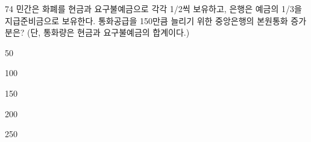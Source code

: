 \begin{question}{74}
민간은 화폐를 현금과 요구불예금으로 각각 1/2씩 보유하고, 은행은 예금의 1/3을 지급준비금으로 보유한다. 통화공급을 150만큼 늘리기 위한 중앙은행의 본원통화 증가분은? (단, 통화량은 현금과 요구불예금의 합계이다.)
\begin{choices}
  \item 50
  \item 100
  \item 150
  \item 200
  \item 250
\end{choices}
\end{question}
